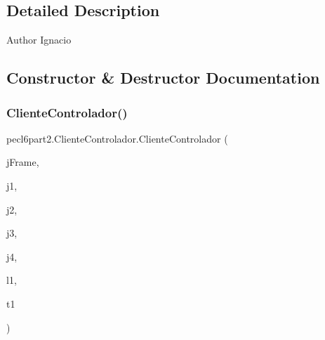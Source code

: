 \subsection{Detailed Description}
\begin{DoxyAuthor}{Author}
Ignacio 
\end{DoxyAuthor}


\subsection{Constructor \& Destructor Documentation}
\mbox{\label{classpecl6part2_1_1_cliente_controlador_a6e526681bd2137858bfb2940eeb23cc8}} 
\subsubsection{\texorpdfstring{Cliente\+Controlador()}{ClienteControlador()}}
{\footnotesize\ttfamily pecl6part2.\+Cliente\+Controlador.\+Cliente\+Controlador (\begin{DoxyParamCaption}\item[{javax.\+swing.\+J\+Frame}]{j\+Frame,  }\item[{javax.\+swing.\+J\+Button}]{j1,  }\item[{javax.\+swing.\+J\+Button}]{j2,  }\item[{javax.\+swing.\+J\+Button}]{j3,  }\item[{javax.\+swing.\+J\+Button}]{j4,  }\item[{javax.\+swing.\+J\+Label}]{l1,  }\item[{javax.\+swing.\+J\+Text\+Field}]{t1 }\end{DoxyParamCaption})\hspace{0.3cm}{\ttfamily [inline]}}


